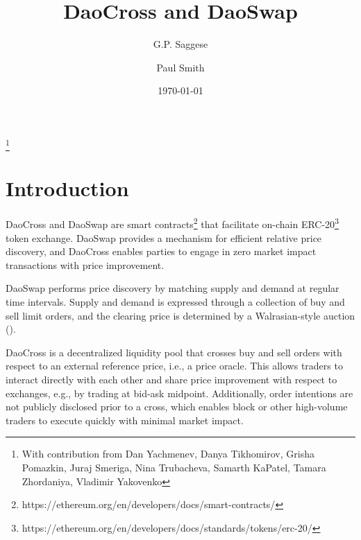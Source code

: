 \documentclass[11pt, reqno]{amsart}
\begin{document}
\title{DaoCross and DaoSwap}

\author{G.P. Saggese}
\author{Paul Smith}

\thanks{With contribution from Dan Yachmenev, Danya Tikhomirov, Grisha
Pomazkin, Juraj Smeriga, Nina Trubacheva, Samarth KaPatel, Tamara Zhordaniya,
Vladimir Yakovenko}

\date{\today}

\maketitle

\tableofcontents



\section{Introduction}
DaoCross and DaoSwap are smart
contracts\footnote{https://ethereum.org/en/developers/docs/smart-contracts/}
that facilitate on-chain
ERC-20\footnote{https://ethereum.org/en/developers/docs/standards/tokens/erc-20/}
token exchange. DaoSwap provides a mechanism for efficient relative price
discovery, and DaoCross enables parties to engage in zero market impact
transactions with price improvement.

DaoSwap performs price discovery by matching supply and demand at regular time
intervals. Supply and demand is expressed through a collection of buy and sell
limit orders, and the clearing price is determined by a Walrasian-style
auction (\cite{Wa}).

DaoCross is a decentralized liquidity pool that crosses buy and sell orders
with respect to an external reference price, i.e., a price oracle. This allows
traders to interact directly with each other and share price improvement with
respect to exchanges, e.g., by trading at bid-ask midpoint. Additionally, order
intentions are not publicly disclosed prior to a cross, which enables block or
other high-volume traders to execute quickly with minimal market impact.
\end{document}
